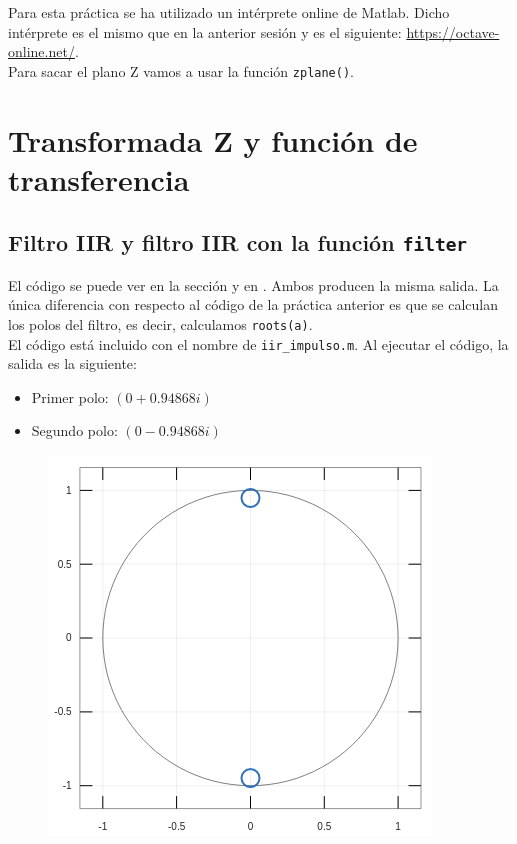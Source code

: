 \documentclass[11pt,a4paper]{article}
\begin{document}
\tableofcontents
\thispagestyle{empty}

\newpage

Para esta práctica se ha utilizado un intérprete online de Matlab. Dicho intérprete es el mismo que en la anterior sesión y es el siguiente: \color{blue} \url{https://octave-online.net/}\color{black}.\\

Para sacar el plano Z vamos a usar la función \texttt{zplane()}.

\section{Transformada Z y función de transferencia}
\subsection{Filtro IIR y filtro IIR con la función \texttt{filter}}

	El código se puede ver en la sección \color{deepred}\color{black} y en \color{deepred}\color{black}. Ambos producen la misma salida. La única diferencia con respecto al código de la práctica anterior es que se calculan los polos del filtro, es decir, calculamos \texttt{roots(a)}.\\
	
	El código está incluido con el nombre de \texttt{iir\_impulso.m}. Al ejecutar el código, la salida es la siguiente:
	
	\begin{itemize}
		\item Primer polo: $(0 + 0.94868i)$
		\item Segundo polo: $(0 - 0.94868i)$
	\end{itemize}
	
\begin{figure}[H]
  \centering
  \includegraphics[width=0.5\linewidth]{img/polosg1.png}
\end{figure}
	
\end{document}
